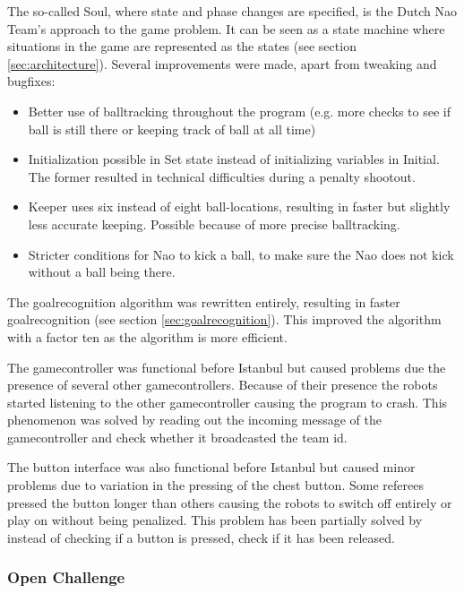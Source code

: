 \documentclass[11pt,a4paper,oneside]{article}
\begin{document}
The so-called Soul, where state and phase changes are specified, is the Dutch Nao Team's approach to the game problem. It can be seen as a state machine where situations in the game are represented as the states (see section \ref{sec:architecture}). Several improvements were made, apart from tweaking and bugfixes:
\begin{itemize}
\item Better use of balltracking throughout the program (e.g. more checks to see if ball is still there or keeping track of ball at all time)
\item Initialization possible in Set state instead of initializing variables in Initial. The former resulted in technical difficulties during a penalty shootout.
\item Keeper uses six instead of eight ball-locations, resulting in faster but slightly less accurate keeping. Possible because of more precise balltracking.
\item Stricter conditions for Nao to kick a ball, to make sure the Nao does not kick without a ball being there. 
\end{itemize}

The goalrecognition algorithm was rewritten entirely, resulting in faster goalrecognition (see section \ref{sec:goalrecognition}). This improved the algorithm with a factor ten as the algorithm is more efficient.

The gamecontroller was functional before Istanbul but caused problems due the presence of several other gamecontrollers. Because of their presence the robots started listening to the other gamecontroller causing the program to crash. This phenomenon was solved by reading out the incoming message of the gamecontroller and check whether it broadcasted the team id.

The button interface was also functional before Istanbul but caused minor problems due to variation in the pressing of the chest button. Some referees pressed the button longer than others causing the robots to switch off entirely or play on without being penalized. This problem has been partially solved by instead of checking if a button is pressed, check if it has been released.

\subsubsection{Open Challenge}
\label{sec:zoneblocking}
\end{document}
